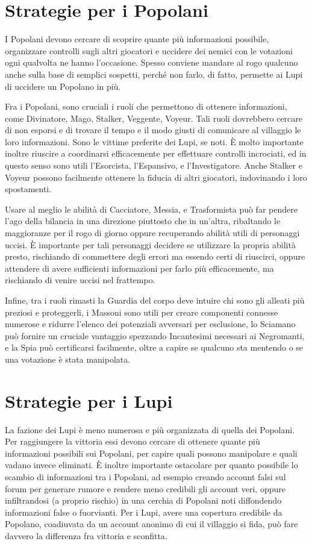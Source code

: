 \documentclass[a4paper,10pt]{article}
\begin{document}
\section{Strategie per i Popolani}

I Popolani devono cercare di scoprire quante più informazioni possibile, organizzare controlli sugli altri giocatori e uccidere dei nemici con le votazioni ogni qualvolta ne hanno l'occasione. Spesso conviene mandare al rogo qualcuno anche sulla base di semplici sospetti, perché non farlo, di fatto, permette ai Lupi di uccidere un Popolano in più.

Fra i Popolani, sono cruciali i ruoli che permettono di ottenere informazioni, come Divinatore, Mago, Stalker, Veggente, Voyeur. Tali ruoli dovrebbero cercare di non esporsi e di trovare il tempo e il modo giusti di comunicare al villaggio le loro informazioni. Sono le vittime preferite dei Lupi, se noti. È molto importante inoltre riuscire a coordinarsi efficacemente per effettuare controlli incrociati, ed in questo senso sono utili l'Esorcista, l'Espansivo, e l'Investigatore. Anche Stalker e Voyeur possono facilmente ottenere la fiducia di altri giocatori, indovinando i loro spostamenti.

Usare al meglio le abilità di Cacciatore, Messia, e Trasformista può far pendere l'ago della bilancia in una direzione piuttosto che in un'altra, ribaltando le maggioranze per il rogo di giorno oppure recuperando abilità utili di personaggi uccisi. È importante per tali personaggi decidere se utilizzare la propria abilità presto, rischiando di commettere degli errori ma essendo certi di riuscirci, oppure attendere di avere sufficienti informazioni per farlo più efficacemente, ma rischiando di venire uccisi nel frattempo.

Infine, tra i ruoli rimasti la Guardia del corpo deve intuire chi sono gli alleati più preziosi e proteggerli, i Massoni sono utili per creare componenti connesse numerose e ridurre l'elenco dei potenziali avversari per esclusione, lo Sciamano può fornire un cruciale vantaggio spezzando Incantesimi necessari ai Negromanti, e la Spia può certificarsi facilmente, oltre a capire se qualcuno sta mentendo o se una votazione è stata manipolata.

\section{Strategie per i Lupi}

La fazione dei Lupi è meno numerosa e più organizzata di quella dei Popolani. Per raggiungere la vittoria essi devono cercare di ottenere quante più informazioni possibili sui Popolani, per capire quali possono manipolare e quali vadano invece eliminati. È inoltre importante ostacolare per quanto possibile lo scambio di informazioni tra i Popolani, ad esempio creando account falsi sul forum per generare rumore e rendere meno credibili gli account veri, oppure infiltrandosi (a proprio rischio) in una cerchia di Popolani noti diffondendo informazioni false o fuorvianti. Per i Lupi, avere una copertura credibile da Popolano, coadiuvata da un account anonimo di cui il villaggio si fida, può fare davvero la differenza fra vittoria e sconfitta.
\end{document}
